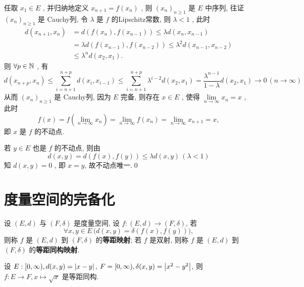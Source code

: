     \begin{Proof}
        任取 $ x_{1}\in E $ , 并归纳地定义 $ x_{n+1}=f(x_{n}) $ , 则 $ (x_{n})_{n\geqslant1} $ 是 $ E $ 中序列, 往证 $ (x_{n})_{n\geqslant1} $ 是 Cauchy列, 令 $ \lambda $ 是 $ f $ 的Lipschitz常数, 则 $ \lambda<1 $ , 此时
        \[
            \begin{aligned}
                d(x_{n+1}, x_{n}) & = d(f(x_{n}), f(x_{n-1})) \leqslant \lambda d(x_{n}, x_{n-1}) \\
                & =\lambda d(f(x_{n-1}), f(x_{n-2}))\leqslant \lambda^{2} d(x_{n-1}, x_{n-2}) \\
                & \leqslant \lambda^{n} d(x_{2}, x_{1}).
            \end{aligned}
        \]
        则 $ \forall p\in \mathbb{N} $ , 有
        \[
            d(x_{n+p}, x_{n})\leqslant\sum_{i=n+1}^{n+p}d(x_{i}, x_{i-1})\leqslant\sum_{i=n+1}^{n+p}\lambda^{i-2}d(x_{2}, x_{1})=\frac{\lambda^{n-1}}{1-\lambda}d(x_{2}, x_{1})\to 0\,(n\to\infty)
        \]
        从而 $ (x_{n})_{n\geqslant1} $ 是 Cauchy列, 因为 $ E $ 完备, 则存在 $ x\in E $ , 使得 $ \lim\limits_{n\to \infty}x_{n}=x $ , 此时
        \[
            f(x)=f(\lim_{n\to\infty}x_{n})=\lim_{n\to\infty}f(x_{n})=\lim_{n\to\infty}x_{n+1}=x,
        \]
        即 $ x $ 是 $ f $ 的不动点.

        若 $ y\in E $ 也是 $ f $ 的不动点, 则由
        \[
            d(x, y)=d(f(x), f(y))\leqslant\lambda d(x, y)\,(\lambda<1)
        \]
        知 $ d(x, y)=0 $ , 即 $ x=y $, 故不动点唯一.\qed
    \end{Proof}



\section{度量空间的完备化}
    \begin{Definition}[等距同构]\label{def:等距同构}
         设 $ (E, d) $ 与 $ (F, \delta) $ 是度量空间, 设 $ f:(E, d)\to(F, \delta) $, 若
         \[
             \forall x, y\in E\,\big(d(x, y)=\delta(f(x), f(y))\big),
         \]
         则称 $ f $ 是 $ (E, d) $ 到 $ (F, \delta) $ 的\textbf{等距映射}; 若 $ f $ 是双射, 则称 $ f $ 是 $ (E, d) $ 到 $ (F, \delta) $ 的\textbf{等距同构映射}.
    \end{Definition}

    \begin{Example}
        设 $ E:[0,\infty), d(x, y)=\left| x-y \right|  $, $ F=[0, \infty), \delta(x, y)=\left| x^{2}-y^{2} \right|  $, 则 $ f:E\to F, x\mapsto \sqrt{x} $ 是等距同构.
    \end{Example}

